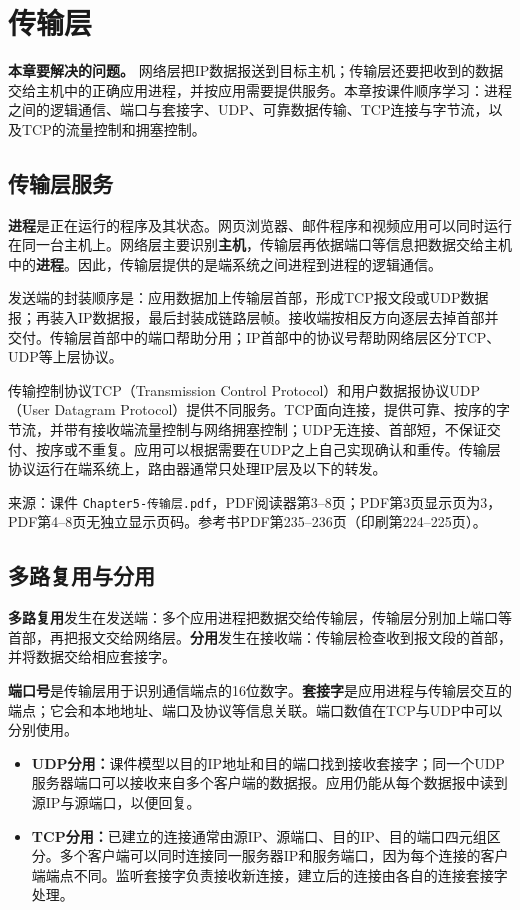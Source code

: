 \chapter{传输层}

\noindent\textbf{本章要解决的问题。} 网络层把IP数据报送到目标主机；传输层还要把收到的数据交给主机中的正确应用进程，并按应用需要提供服务。本章按课件顺序学习：进程之间的逻辑通信、端口与套接字、UDP、可靠数据传输、TCP连接与字节流，以及TCP的流量控制和拥塞控制。

\section{传输层服务}
\textbf{进程}是正在运行的程序及其状态。网页浏览器、邮件程序和视频应用可以同时运行在同一台主机上。网络层主要识别\textbf{主机}，传输层再依据端口等信息把数据交给主机中的\textbf{进程}。因此，传输层提供的是端系统之间进程到进程的逻辑通信。

发送端的封装顺序是：应用数据加上传输层首部，形成TCP报文段或UDP数据报；再装入IP数据报，最后封装成链路层帧。接收端按相反方向逐层去掉首部并交付。传输层首部中的端口帮助分用；IP首部中的协议号帮助网络层区分TCP、UDP等上层协议。

传输控制协议TCP（Transmission Control Protocol）和用户数据报协议UDP（User Datagram Protocol）提供不同服务。TCP面向连接，提供可靠、按序的字节流，并带有接收端流量控制与网络拥塞控制；UDP无连接、首部短，不保证交付、按序或不重复。应用可以根据需要在UDP之上自己实现确认和重传。传输层协议运行在端系统上，路由器通常只处理IP层及以下的转发。

\annotationarea[4]
\small 来源：课件 \texttt{Chapter5-传输层.pdf}，PDF阅读器第3--8页；PDF第3页显示页为3，PDF第4--8页无独立显示页码。参考书PDF第235--236页（印刷第224--225页）。\normalsize

\section{多路复用与分用}
\textbf{多路复用}发生在发送端：多个应用进程把数据交给传输层，传输层分别加上端口等首部，再把报文交给网络层。\textbf{分用}发生在接收端：传输层检查收到报文段的首部，并将数据交给相应套接字。

\textbf{端口号}是传输层用于识别通信端点的16位数字。\textbf{套接字}是应用进程与传输层交互的端点；它会和本地地址、端口及协议等信息关联。端口数值在TCP与UDP中可以分别使用。

\begin{itemize}[nosep]
\item \textbf{UDP分用：}课件模型以目的IP地址和目的端口找到接收套接字；同一个UDP服务器端口可以接收来自多个客户端的数据报。应用仍能从每个数据报中读到源IP与源端口，以便回复。
\item \textbf{TCP分用：}已建立的连接通常由源IP、源端口、目的IP、目的端口四元组区分。多个客户端可以同时连接同一服务器IP和服务端口，因为每个连接的客户端端点不同。监听套接字负责接收新连接，建立后的连接由各自的连接套接字处理。
\end{itemize}

